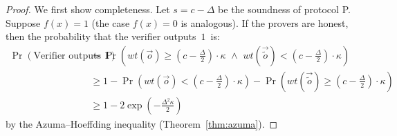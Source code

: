 \documentclass{toc}
\begin{document}
\begin{proof} We first show completeness. 
Let $s = c- \Delta$ be the soundness of protocol P.
Suppose $f(x) = 1$ (the case $f(x) = 0$ is analogous). If the provers are honest, then the probability that the verifier outputs~$1$~is:
\begin{align*}
\Pr(\mbox{Verifier outputs $1$}) &= \Pr \left(wt(\vec{o}) \geq \left(c - \frac{\Delta}{2}\right)\cdot \kappa \,\, \land \,\, wt(\vec{\tilde{o}}) < \left(c - \frac{\Delta}{2}\right)\cdot \kappa \right)\\
&\geq 1-\Pr \left(wt(\vec{o}) < \left(c - \frac{\Delta}{2}\right)\cdot \kappa \right) - \Pr \left(wt(\vec{\tilde{o}}) \geq \left(c - \frac{\Delta}{2}\right)\cdot \kappa \right) \\
&\geq 1 - 2\exp \left(-\frac{\Delta^2\kappa}{2}\right)
\end{align*}
\nopagebreak    %
%
by the Azuma--Hoeffding inequality  %
(Theorem~\ref{thm:azuma}).
%


\end{proof}
\end{document}
